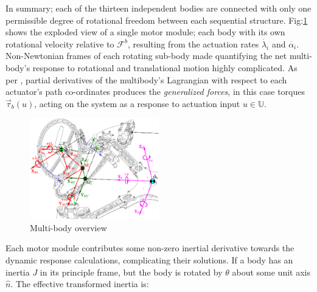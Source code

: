 \documentclass[a4paper, 10pt, conference]{ieeeconf}
\begin{document}
\par
In summary; each of the thirteen independent bodies are connected with only one permissible degree of rotational freedom between each sequential structure. Fig:\ref{fig:response-body} shows the exploded view of a single motor module; each body with its own rotational velocity relative to $\mathcal{F}^b$, resulting from the actuation rates $\dot{\lambda_i}$ and $\dot{\alpha_i}$. Non-Newtonian frames of each rotating sub-body made quantifying the net multi-body's response to rotational and translational motion highly complicated. As per \cite{lagrange}, partial derivatives of the multibody's Lagrangian with respect to each actuator's path co-ordinates produces the \emph{generalized forces}, in this case torques $\vec{\tau}_b(u)$, acting on the system as a response to actuation input $u\in\mathbb{U}$.
\begin{figure}[bp]
\vspace{-15pt}
\centering
\includegraphics[width=0.5\textwidth]{figs/response-body}
\vspace{-20pt}
\caption{Multi-body overview}
\label{fig:response-body}
\vspace{-3pt}
\end{figure}
\newpage
Each motor module contributes some non-zero inertial derivative towards the dynamic response calculations, complicating their solutions. If a body has an inertia $J$ in its principle frame, but the body is rotated by $\theta$ about some unit axis $\hat{n}$. The effective transformed inertia is:
\end{document}
